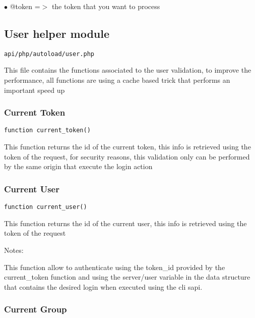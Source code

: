 \documentclass[a4paper]{article}
\begin{document}
\begin{compactitem}
\item[\color{myblue}$\bullet$] @token =$>$ the token that you want to process
\end{compactitem}

\hypertarget{toc262}{}
\subsection{User helper module}

\begin{lstlisting}
api/php/autoload/user.php
\end{lstlisting}

This file contains the functions associated to the user validation, to
improve the performance, all functions are using a cache based trick
that performs an important speed up

\hypertarget{toc263}{}
\subsubsection{Current Token}

\begin{lstlisting}
function current_token()
\end{lstlisting}

This function returns the id of the current token, this info is retrieved
using the token of the request, for security reasons, this validation only
can be performed by the same origin that execute the login action

\hypertarget{toc264}{}
\subsubsection{Current User}

\begin{lstlisting}
function current_user()
\end{lstlisting}

This function returns the id of the current user, this info is retrieved
using the token of the request

Notes:

This function allow to authenticate using the token\_id provided by the
current\_token function and using the server/user variable in the data
structure that contains the desired login when executed using the cli
sapi.

\hypertarget{toc265}{}
\subsubsection{Current Group}
\end{document}
